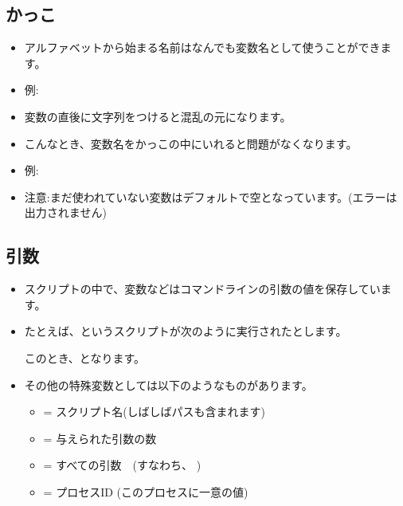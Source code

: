 \documentclass{jsarticle}
\begin{document}
\subsection{かっこ}



\begin{itemize}

\item アルファベットから始まる名前はなんでも変数名として使うことができます。
\item 例:{\color{red}}
\item 変数の直後に文字列をつけると混乱の元になります。
\item こんなとき、変数名をかっこの中にいれると問題がなくなります。

\item 例:

{}

\item 注意:まだ使われていない変数はデフォルトで空となっています。(エラーは出力されません)
\end{itemize}




\subsection{引数}


\begin{itemize}

\item スクリプトの中で、変数{\color{red}}などはコマンドラインの引数の値を保存しています。
\item たとえば、というスクリプトが次のように実行されたとします。

{\color{red}}

このとき、{\color{red}}となります。

\item その他の特殊変数としては以下のようなものがあります。

	\begin{itemize}
	\item {\color{red}{\tt \$0}} = スクリプト名(しばしばパスも含まれます)
	\item {\color{red}{\tt \$\#}} = 与えられた引数の数
	\item {\color{red}{\tt \$@}} = すべての引数　(すなわち、{\color{red}} )
	\item {\color{red}{\tt \$\$}} = プロセスID (このプロセスに一意の値) 
	\end{itemize}

\end{itemize}
\end{document}
